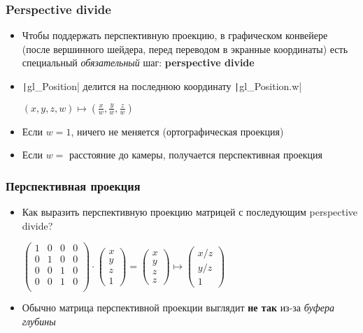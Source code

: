 \documentclass[10pt]{beamer}
\begin{document}
\begin{frame}[fragile]
\frametitle{Perspective divide}
\begin{itemize}
\item Чтобы поддержать перспективную проекцию, в графическом конвейере (после вершинного шейдера, перед переводом в экранные координаты) есть специальный \textit{обязательный} шаг: \textbf{perspective divide}
\pause
\item \texttt|gl_Position| делится на последнюю координату \texttt|gl_Position.w|
\begin{center}
\begin{math}
(x, y, z, w) \mapsto \left(\frac{x}{w}, \frac{y}{w}, \frac{z}{w}\right)
\end{math}
\end{center}
\pause
\item Если \begin{math}w=1\end{math}, ничего не меняется (ортографическая проекция)
\pause
\item Если \begin{math}w=\end{math} расстояние до камеры, получается перспективная проекция
\end{itemize}
\end{frame}

\begin{frame}[fragile]
\frametitle{Перспективная проекция}
\begin{itemize}
\item Как выразить перспективную проекцию матрицей с последующим perspective divide?
\pause
\begin{center}
\begin{math}
\begin{pmatrix}
1 & 0 & 0 & 0 \\
0 & 1 & 0 & 0 \\
0 & 0 & 1 & 0 \\
0 & 0 & 1 & 0 \\
\end{pmatrix}
\cdot
\begin{pmatrix}
x \\ y \\ z \\ 1
\end{pmatrix}
=
\begin{pmatrix}
x \\ y \\ z \\ z
\end{pmatrix}
\mapsto
\begin{pmatrix}
x/z \\ y/z \\ 1
\end{pmatrix}
\end{math}
\end{center}
\pause
\item Обычно матрица перспективной проекции выглядит \textbf{\alert{не так}} из-за \textit{буфера глубины}
\end{itemize}
\end{frame}
\end{document}
